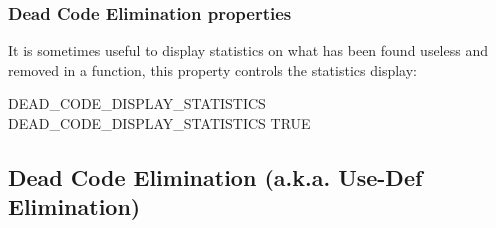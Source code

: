 \documentclass[a4paper]{report}
\begin{document}
\subsubsection{Dead Code Elimination properties}

It is sometimes useful to display statistics on what has been found
useless and removed in a function, this property controls the
statistics display:
\begin{PipsProp}{DEAD_CODE_DISPLAY_STATISTICS}
DEAD_CODE_DISPLAY_STATISTICS TRUE
\end{PipsProp}


\subsection{Dead Code Elimination (a.k.a. Use-Def Elimination)}
\label{sec:use-def-elimination}
\end{document}
